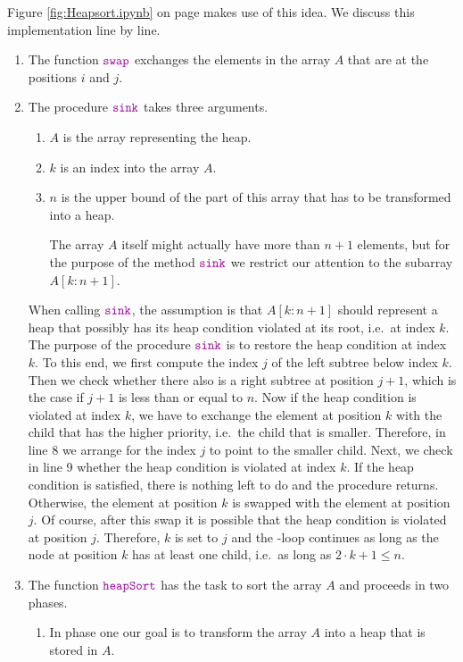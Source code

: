 Figure \ref{fig:Heapsort.ipynb} on page \pageref{fig:Heapsort.ipynb} makes use of this idea.
We discuss this implementation line by line.
\begin{enumerate}
\item The function $\mytt{swap}$ exchanges the elements in the array ${A}$ that are at the
      positions $i$ and $j$.
\item The procedure $\mytt{sink}$ takes three arguments.
      \begin{enumerate}
      \item ${A}$ is the array representing the heap.
      \item ${k}$ is an index into the array ${A}$.
      \item ${n}$ is the upper bound  of the part of this array that has to be transformed into a heap.  

            The array ${A}$ itself might actually have more than $n+1$ elements, but for the
            purpose of the method $\mytt{sink}$ we restrict our attention to the subarray
            ${A[k:n+1]}$. 
      \end{enumerate}
      When calling $\mytt{sink}$, the assumption is that $A[{k:n+1}]$ should represent a heap 
      that possibly has its heap condition violated at its root, i.e.~at index ${k}$.  The
      purpose of the procedure $\mytt{sink}$ is to restore the heap condition at index ${k}$.
      To this end, we first compute the index ${j}$ of the left subtree below index ${k}$.
      Then we check whether there also is a right subtree at position ${j}+1$, which is the
      case if $j + 1$ is less than or equal to  ${n}$.  Now if the heap condition is violated at index
      ${k}$, we have to exchange the element at  position ${k}$ with the child that has
      the higher priority, i.e.~the child that is smaller. Therefore, in line 8 we arrange for the index
      ${j}$ to point to the smaller child.  Next, we check in line 9 whether the heap
      condition is violated at index ${k}$.  If the heap condition is satisfied, there is
      nothing left to do and the procedure returns.  Otherwise, the element at position ${k}$ is swapped with
      the element at position ${j}$.  Of course, after this swap it is possible that the heap condition is
      violated at position ${j}$.  Therefore,  ${k}$ is set to ${j}$ and the -loop continues
      as long as the node at position ${k}$ has at least one child, i.e.~as long as 
      $2 \cdot {k} + 1 \leq {n}$.
\item The function $\mytt{heapSort}$ has the task to sort the array ${A}$ and proceeds in two phases.
      \begin{enumerate}
      \item In phase one our goal is to transform the array ${A}$ into a heap that is stored in ${A}$.


\end{enumerate}
\end{enumerate}
